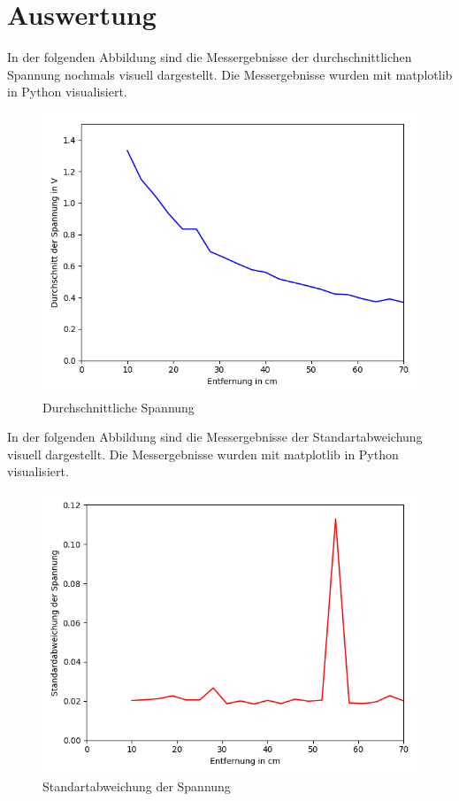 \documentclass[12pt, oneside, a4paper, \docLanguage]{report}
\begin{document}
\section{Auswertung}
\label{chap:VERSUCH_1_AUSWERTUNG}
In der folgenden Abbildung sind die Messergebnisse der durchschnittlichen Spannung nochmals visuell dargestellt. Die Messergebnisse wurden mit matplotlib in Python visualisiert.

\begin{figure}[H]
	\centering\small
	\includegraphics[width=\textwidth]{media/myplot.png}
	\caption{Durchschnittliche Spannung}
	\label{fig:VERSUCH_1_PLOT_DURCHSCNITTLICHE_SAPNNUNG}
\end{figure}

\newpage
In der folgenden Abbildung sind die Messergebnisse der Standartabweichung visuell dargestellt. Die Messergebnisse wurden mit matplotlib in Python visualisiert.

\begin{figure}[H]
	\centering\small
	\includegraphics[width=\textwidth]{media/myplot2.png}
	\caption{Standartabweichung der Spannung}
	\label{fig:VERSUCH_1_PLOT_STANDARTABWEICHUNG}
\end{figure}
\end{document}
